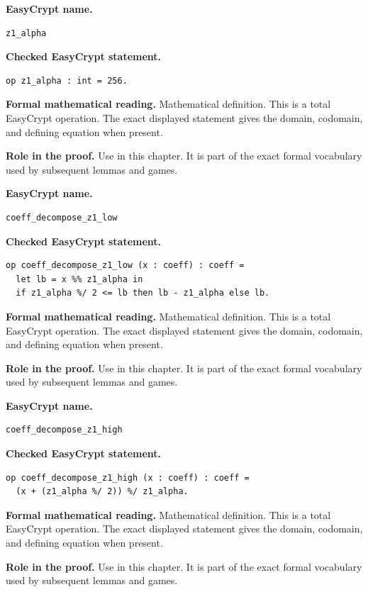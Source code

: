 \begin{formaldefinition}
\noindent\textbf{EasyCrypt name.}
\begin{lstlisting}[language=EasyCrypt,basicstyle=\ttfamily\scriptsize]
z1_alpha
\end{lstlisting}
\noindent\textbf{Checked EasyCrypt statement.}
\begin{lstlisting}[language=EasyCrypt,basicstyle=\ttfamily\scriptsize]
op z1_alpha : int = 256.
\end{lstlisting}
\noindent\textbf{Formal mathematical reading.}
Mathematical definition. This is a total EasyCrypt operation.  The exact displayed statement gives the domain, codomain, and defining equation when present.

\noindent\textbf{Role in the proof.}
Use in this chapter. It is part of the exact formal vocabulary used by subsequent lemmas and games.

\end{formaldefinition}

\begin{formaldefinition}
\noindent\textbf{EasyCrypt name.}
\begin{lstlisting}[language=EasyCrypt,basicstyle=\ttfamily\scriptsize]
coeff_decompose_z1_low
\end{lstlisting}
\noindent\textbf{Checked EasyCrypt statement.}
\begin{lstlisting}[language=EasyCrypt,basicstyle=\ttfamily\scriptsize]
op coeff_decompose_z1_low (x : coeff) : coeff =
  let lb = x %% z1_alpha in
  if z1_alpha %/ 2 <= lb then lb - z1_alpha else lb.
\end{lstlisting}
\noindent\textbf{Formal mathematical reading.}
Mathematical definition. This is a total EasyCrypt operation.  The exact displayed statement gives the domain, codomain, and defining equation when present.

\noindent\textbf{Role in the proof.}
Use in this chapter. It is part of the exact formal vocabulary used by subsequent lemmas and games.

\end{formaldefinition}

\begin{formaldefinition}
\noindent\textbf{EasyCrypt name.}
\begin{lstlisting}[language=EasyCrypt,basicstyle=\ttfamily\scriptsize]
coeff_decompose_z1_high
\end{lstlisting}
\noindent\textbf{Checked EasyCrypt statement.}
\begin{lstlisting}[language=EasyCrypt,basicstyle=\ttfamily\scriptsize]
op coeff_decompose_z1_high (x : coeff) : coeff =
  (x + (z1_alpha %/ 2)) %/ z1_alpha.
\end{lstlisting}
\noindent\textbf{Formal mathematical reading.}
Mathematical definition. This is a total EasyCrypt operation.  The exact displayed statement gives the domain, codomain, and defining equation when present.

\noindent\textbf{Role in the proof.}
Use in this chapter. It is part of the exact formal vocabulary used by subsequent lemmas and games.

\end{formaldefinition}

